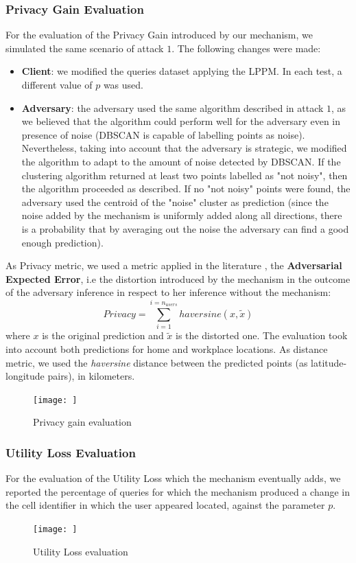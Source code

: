 \documentclass[10pt,conference,compsocconf]{IEEEtran}
\begin{document}
\subsubsection{Privacy Gain Evaluation}
For the evaluation of the Privacy Gain introduced by our mechanism, we simulated the same scenario of attack $1$. The following changes were made:
\begin{itemize}
    \item \textbf{Client}: we modified the queries dataset applying the LPPM. In each test, a different value of $p$ was used.
    \item \textbf{Adversary}: the adversary used the same algorithm described in attack $1$, as we believed that the algorithm could perform well for the adversary even in presence of noise (DBSCAN is capable of labelling points as noise). Nevertheless, taking into account that the adversary is strategic, we modified the algorithm to adapt to the amount of noise detected by DBSCAN. If the clustering algorithm returned at least two points labelled as "not noisy", then the algorithm proceeded as described. If no "not noisy" points were found, the adversary used the centroid of the "noise" cluster as prediction (since the noise added by the mechanism is uniformly added along all directions, there is a probability that by averaging out the noise the adversary can find a good enough prediction).
\end{itemize}
As Privacy metric, we used a metric applied in the literature \cite{Shokri}, the \textbf{Adversarial Expected Error}, i.e the distortion introduced by the mechanism in the outcome of the adversary inference in respect to her inference without the mechanism:
\[Privacy = \sum_{i=1}^{i=n_{users}}haversine(x, \tilde{x})\]
where $x$ is the original prediction and $\tilde{x}$ is the distorted one. The evaluation took into account both predictions for home and workplace locations. As distance metric, we used the \textit{haversine} distance between the predicted points (as latitude-longitude pairs), in kilometers.
    \begin{figure}
        \centering
        \texttt{[image: ]}
        \caption{Privacy gain evaluation}
        \label{fig:my_label}
    \end{figure}
\subsubsection{Utility Loss Evaluation}
For the evaluation of the Utility Loss which the mechanism eventually adds, we reported the percentage of queries for which the mechanism produced a change in the cell identifier in which the user appeared located, against the parameter $p$.
\begin{figure}
    \centering
    \texttt{[image: ]}
    \caption{Utility Loss evaluation}
    \label{fig:my_label}
\end{figure}
\end{document}
